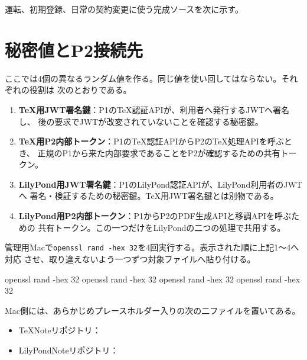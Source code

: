 \documentclass[uplatex,a4paper,11pt]{jsarticle}
\begin{document}
運転、初期登録、日常の契約変更に使う完成ソースを次に示す。







\section{秘密値とP2接続先}

ここでは4個の異なるランダム値を作る。同じ値を使い回してはならない。それぞれの役割は
次のとおりである。

\begin{enumerate}
  \item \textbf{TeX用JWT署名鍵}：P1のTeX認証APIが、利用者へ発行するJWTへ署名し、
        後の要求でJWTが改変されていないことを確認する秘密鍵。
  \item \textbf{TeX用P2内部トークン}：P1のTeX認証APIからP2のTeX処理APIを呼ぶとき、
        正規のP1から来た内部要求であることをP2が確認するための共有トークン。
  \item \textbf{LilyPond用JWT署名鍵}：P1のLilyPond認証APIが、LilyPond利用者のJWTへ
        署名・検証するための秘密鍵。TeX用JWT署名鍵とは別物である。
  \item \textbf{LilyPond用P2内部トークン}：P1からP2のPDF生成APIと移調APIを呼ぶための
        共有トークン。この一つだけをLilyPondの二つの処理で共用する。
\end{enumerate}

管理用Macで\texttt{openssl rand -hex 32}を4回実行する。表示された順に上記1～4へ対応
させ、取り違えないよう一つずつ対象ファイルへ貼り付ける。

\begin{command}
openssl rand -hex 32
openssl rand -hex 32
openssl rand -hex 32
openssl rand -hex 32
\end{command}

Mac側には、あらかじめプレースホルダー入りの次の二ファイルを置いてある。

\begin{itemize}
  \item TeXNoteリポジトリ：
  \item LilyPondNoteリポジトリ：
\end{itemize}
\end{document}
